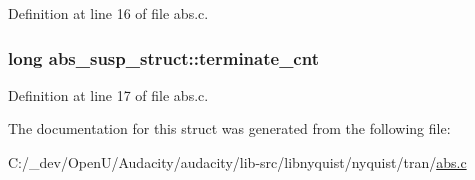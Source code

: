 Definition at line 16 of file abs.\+c.

\subsubsection[{\texorpdfstring{terminate\+\_\+cnt}{terminate_cnt}}]{\setlength{\rightskip}{0pt plus 5cm}long abs\+\_\+susp\+\_\+struct\+::terminate\+\_\+cnt}\hypertarget{structabs__susp__struct_af34d90c1c97bef541d85523ca7056cc9}{}\label{structabs__susp__struct_af34d90c1c97bef541d85523ca7056cc9}


Definition at line 17 of file abs.\+c.



The documentation for this struct was generated from the following file\+:\begin{DoxyCompactItemize}
\item 
C\+:/\+\_\+dev/\+Open\+U/\+Audacity/audacity/lib-\/src/libnyquist/nyquist/tran/\hyperlink{abs_8c}{abs.\+c}\end{DoxyCompactItemize}

